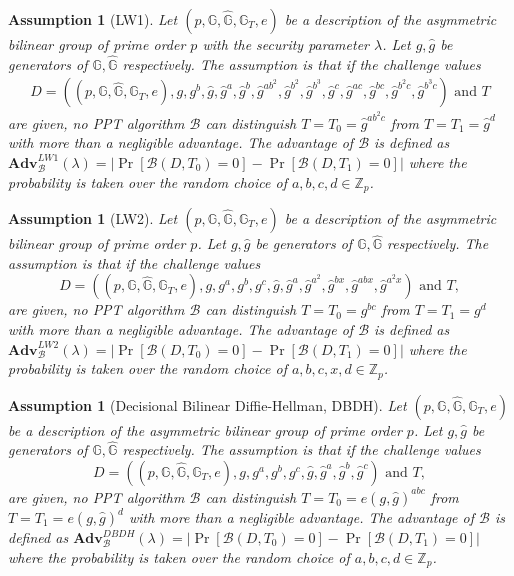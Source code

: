 \documentclass[11pt,letterpaper]{article}
\newtheorem{assumption}[theorem]{Assumption}
\newcommand{\G}{\mathbb{G}}
\newcommand{\Z}{\mathbb{Z}}
\newcommand{\Adv}{\textbf{Adv}}
\newcommand{\mc}[1]{\mathcal{#1}}
\begin{document}
\begin{assumption}[LW1]
Let $(p, \G, \hat{\G}, \G_T, e)$ be a description of the asymmetric bilinear
group of prime order $p$ with the security parameter $\lambda$. Let $g,
\hat{g}$ be generators of $\G, \hat{\G}$ respectively. The assumption is that
if the challenge values
    \begin{align*}
    D = ((p, \G, \hat{\G}, \G_T, e),
        g, g^b, \hat{g}, \hat{g}^a, \hat{g}^b, \hat{g}^{ab^2}, \hat{g}^{b^2},
        \hat{g}^{b^3}, \hat{g}^c, \hat{g}^{ac}, \hat{g}^{bc}, \hat{g}^{b^2 c},
        \hat{g}^{b^3 c}) \mbox{ and } T
    \end{align*}
are given, no PPT algorithm $\mc{B}$ can distinguish $T = T_0 = \hat{g}^{ab^2
c}$ from $T = T_1 = \hat{g}^d$ with more than a negligible advantage. The
advantage of $\mc{B}$ is defined as $\Adv_{\mc{B}}^{LW1} (\lambda) = \big|
\Pr[\mc{B}(D,T_0)=0] - \Pr[\mc{B}(D,T_1)=0] \big|$ where the probability is
taken over the random choice of $a, b, c, d \in \Z_p$.
\end{assumption}

\begin{assumption}[LW2]
Let $(p, \G, \hat{\G}, \G_T, e)$ be a description of the asymmetric bilinear
group of prime order $p$. Let $g, \hat{g}$ be generators of $\G, \hat{\G}$
respectively. The assumption is that if the challenge values
    $$D = ((p, \G, \hat{\G}, \G_T, e),
    g, g^a, g^b, g^c, \hat{g}, \hat{g}^a, \hat{g}^{a^2}, \hat{g}^{bx},
    \hat{g}^{abx}, \hat{g}^{a^2x}) \mbox{ and } T,$$
are given, no PPT algorithm $\mc{B}$ can distinguish $T = T_0 = g^{bc}$ from
$T = T_1 = g^d$ with more than a negligible advantage. The advantage of
$\mc{B}$ is defined as $\Adv_{\mc{B}}^{LW2}(\lambda) = \big| \Pr[\mc{B}(D,
T_0)=0] - \Pr[\mc{B}(D, T_1)=0] \big|$ where the probability is taken over
the random choice of $a, b, c, x, d \in \Z_p$.
\end{assumption}

\begin{assumption}[Decisional Bilinear Diffie-Hellman, DBDH]
Let $(p, \G, \hat{\G}, \G_T, e)$ be a description of the asymmetric bilinear
group of prime order $p$. Let $g, \hat{g}$ be generators of $\G, \hat{\G}$
respectively. The assumption is that if the challenge values
    $$D = ((p, \G, \hat{\G}, \G_T, e),
    g, g^a, g^b, g^c, \hat{g}, \hat{g}^a, \hat{g}^b, \hat{g}^c)
    \mbox{ and } T,$$
are given, no PPT algorithm $\mc{B}$ can distinguish $T = T_0 = e(g,
\hat{g})^{abc}$ from $T = T_1 = e(g, \hat{g})^{d}$ with more than a
negligible advantage. The advantage of $\mc{B}$ is defined as
$\Adv_{\mc{B}}^{DBDH}(\lambda) = \big| \Pr[\mc{B}(D, T_0)=0] - \Pr[\mc{B}(D,
T_1)=0] \big|$ where the probability is taken over the random choice of $a,
b, c, d \in \Z_p$.
\end{assumption}
\end{document}
